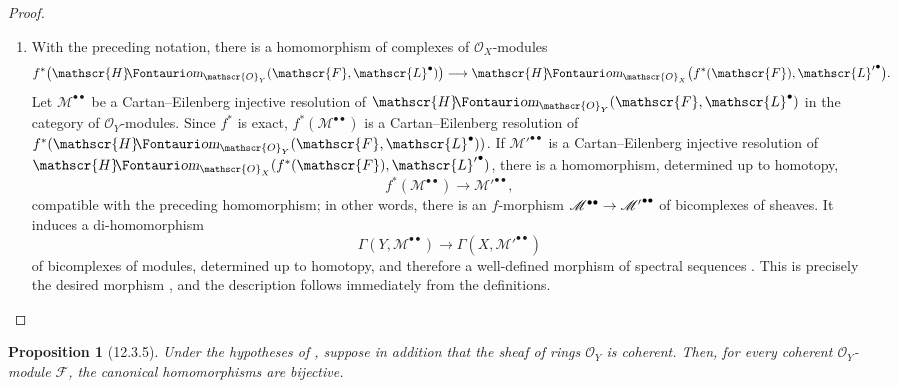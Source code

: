 \documentclass[oneside]{amsart}
\theoremstyle{ega-env-style}
\theoremstyle{ega-thm-env-style}
\newtheorem*{proposition}{Proposition}
\theoremstyle{ega-defn-env-style}
\def\mathcal{\mathscr}
\def\sh{\mathcal}                   %
\renewcommand{\to}{\mathchoice{\longrightarrow}{\rightarrow}{\rightarrow}{\rightarrow}}
\def\shHom{\sh{H}\textup{\kern-2.2pt{\Fontauri\slshape om}}}   %
\let\EGAOriginalLabel\label
\renewcommand{\label}[1]{\phantomsection\EGAOriginalLabel{#1}}
\begin{document}
\begin{proof}
\begin{enumerate}
  \item[\rm(ii)]
  With the preceding notation, there is a homomorphism of complexes of
  $\sh{O}_X$-modules
  \[
    f^*\bigl(\shHom_{\sh{O}_Y}(\sh{F},\sh{L}^\bullet)\bigr)
    \longrightarrow
    \shHom_{\sh{O}_X}
      \bigl(f^*(\sh{F}),{\sh{L}'}^\bullet\bigr).
  \]
  Let $\sh{M}^{\bullet\bullet}$ be a Cartan--Eilenberg injective
  resolution of
  $\shHom_{\sh{O}_Y}(\sh{F},\sh{L}^\bullet)$ in the category of
  $\sh{O}_Y$-modules.  Since $f^*$ is exact,
  $f^*(\sh{M}^{\bullet\bullet})$ is a Cartan--Eilenberg resolution of
  $f^*(\shHom_{\sh{O}_Y}(\sh{F},\sh{L}^\bullet))$.
  If ${\sh{M}'}^{\bullet\bullet}$ is a Cartan--Eilenberg injective
  resolution of
  $\shHom_{\sh{O}_X}(f^*(\sh{F}),{\sh{L}'}^\bullet)$, there is
   a homomorphism, determined up to homotopy,
  \[
    f^*(\sh{M}^{\bullet\bullet})
    \longrightarrow{\sh{M}'}^{\bullet\bullet},
  \]
  compatible with the preceding homomorphism; in other words, there
  is an $f$-morphism
  $\sh{M}^{\bullet\bullet}\to{\sh{M}'}^{\bullet\bullet}$ of
  bicomplexes of sheaves.
  It induces a di-homomorphism
  \[
    \Gamma(Y,\sh{M}^{\bullet\bullet})
    \longrightarrow\Gamma(X,{\sh{M}'}^{\bullet\bullet})
  \]
  of bicomplexes of modules, determined up to homotopy, and therefore
  a well-defined morphism of spectral sequences
  .  This is precisely the desired morphism
  , and the description
   follows immediately from the definitions.
\end{enumerate}
\end{proof}

\begin{proposition}[12.3.5]
\label{0.12.3.5}
Under the hypotheses of , suppose in addition that the
sheaf of rings $\sh{O}_Y$ is coherent.
Then, for every coherent $\sh{O}_Y$-module $\sh{F}$, the canonical
homomorphisms  are bijective.
\end{proposition}
\end{document}
